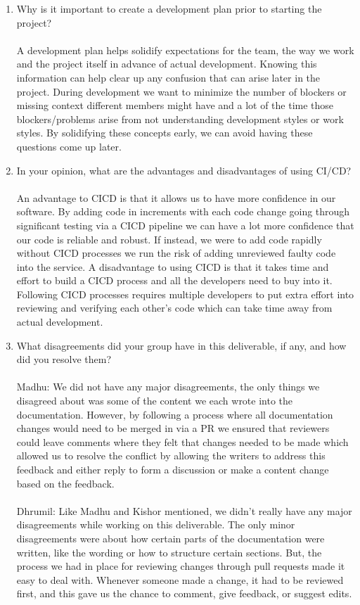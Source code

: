 \documentclass{article}
\begin{document}
\begin{enumerate}
    \item Why is it important to create a development plan prior to starting the
    project?
    \\\\ A development plan helps solidify expectations for the team, the way we work and the project itself in advance of actual development. Knowing this information can help clear up any confusion that can arise later in the project. During development we want to minimize the number of blockers or missing context different members might have and a lot of the time those blockers/problems arise from not understanding development styles or work styles. By solidifying these concepts early, we can avoid having these questions come up later. 
    \item In your opinion, what are the advantages and disadvantages of using
    CI/CD?
    \\\\ An advantage to CICD is that it allows us to have more confidence in our software. By adding code in increments with each code change going through significant testing via a CICD pipeline we can have a lot more confidence that our code is reliable and robust. If instead, we were to add code rapidly without CICD processes we run the risk of adding unreviewed faulty code into the service. A disadvantage to using CICD is that it takes time and effort to build a CICD process and all the developers need to buy into it. Following CICD processes requires multiple developers to put extra effort into reviewing and verifying each other's code which can take time away from actual development. 
    \item What disagreements did your group have in this deliverable, if any,
    and how did you resolve them?
    \\\\ Madhu: We did not have any major disagreements, the only things we disagreed about was some of the content we each wrote into the documentation. However, by following a process where all documentation changes would need to be merged in via a PR we ensured that reviewers could leave comments where they felt that changes needed to be made which allowed us to resolve the conflict by allowing the writers to address this feedback and either reply to form a discussion or make a content change based on the feedback. 
    \\\\ Dhrumil: Like Madhu and Kishor mentioned, we didn’t really have any major disagreements while working on this deliverable. The only minor disagreements were about how certain parts of the documentation were written, like the wording or how to structure certain sections. But, the process we had in place for reviewing changes through pull requests made it easy to deal with. Whenever someone made a change, it had to be reviewed first, and this gave us the chance to comment, give feedback, or suggest edits. 

\end{enumerate}
\end{document}
